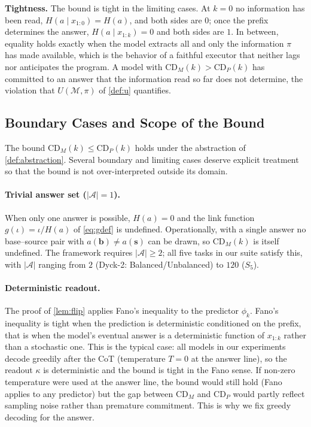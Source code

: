 \documentclass[11pt]{article}
\newcommand{\CDP}{\mathrm{CD}_{P}}
\newcommand{\CDM}{\mathrm{CD}_{M}}
\newcommand{\stepk}{k}
\begin{document}
\noindent\textbf{Tightness.} The bound is tight in the limiting cases. At
$\stepk=0$ no information has been read, $H(a\mid x_{1{:}0})=H(a)$, and both
sides are $0$; once the prefix determines the answer, $H(a\mid
x_{1{:}\stepk})=0$ and both sides are $1$. In between, equality holds exactly
when the model extracts all and only the information $\pi$ has made available,
which is the behavior of a faithful executor that neither lags nor anticipates
the program. A model with $\CDM(\stepk)>\CDP(\stepk)$ has committed to an
answer that the information read so far does not determine, the violation that
$U(\mathcal{M},\pi)$ of \cref{def:u} quantifies.

\subsection{Boundary Cases and Scope of the Bound}
\label{app:proof-boundary}

The bound $\CDM(\stepk)\le\CDP(\stepk)$ holds under the abstraction of
\cref{def:abstraction}. Several boundary and limiting cases deserve explicit
treatment so that the bound is not over-interpreted outside its domain.

\paragraph{Trivial answer set ($|\mathcal{A}|=1$).}
When only one answer is possible, $H(a)=0$ and the link function
$g(\iota)=\iota/H(a)$ of \cref{eq:gdef} is undefined. Operationally, with a
single answer no base--source pair with $a(\mathbf{b})\neq a(\mathbf{s})$ can
be drawn, so $\CDM(\stepk)$ is itself undefined. The framework requires
$|\mathcal{A}|\ge 2$; all five tasks in our suite satisfy this, with
$|\mathcal{A}|$ ranging from $2$ (Dyck-2: Balanced/Unbalanced) to $120$
($S_5$).

\paragraph{Deterministic readout.}
The proof of \cref{lem:flip} applies Fano's inequality to the predictor
$\phi_{\stepk}$. Fano's inequality is tight when the prediction is
deterministic conditioned on the prefix, that is when the model's eventual
answer is a deterministic function of $x_{1{:}\stepk}$ rather than a stochastic
one. This is the typical case: all models in our experiments decode greedily
after the CoT (temperature $T=0$ at the answer line), so the
readout $\kappa$ is deterministic and the bound is tight in the Fano sense. If
non-zero temperature were used at the answer line, the bound would still hold
(Fano applies to any predictor) but the gap between $\CDM$ and $\CDP$ would
partly reflect sampling noise rather than premature commitment. This is why
we fix greedy decoding for the answer.
\end{document}
